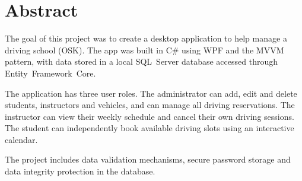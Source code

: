 \chapter*{Abstract}
\thispagestyle{plain}

{
The goal of this project was to create a desktop application to help manage a driving
school (OSK). The app was built in C\# using WPF and the MVVM pattern, with data stored
in a local SQL~Server database accessed through Entity~Framework~Core.

The application has three user roles. The administrator can add, edit and delete students,
instructors and vehicles, and can manage all driving reservations. The instructor can view
their weekly schedule and cancel their own driving sessions. The student can independently
book available driving slots using an interactive calendar.

The project includes data validation mechanisms, secure password storage and
data integrity protection in the database.
}
